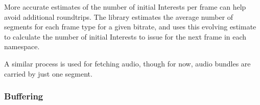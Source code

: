 \documentclass{icn/sig-alternate-2013} %
\begin{document}
More accurate estimates of the number of initial Interests per frame can help avoid additional roundtrips.
The library estimates the average number of segments for each frame type for a given bitrate, and uses this evolving estimate to calculate the number of initial Interests to issue for the next frame in each namespace. %

A similar process is used for fetching audio, though for now, audio bundles are carried by just one segment.


\subsubsection{Buffering}

\end{document}
